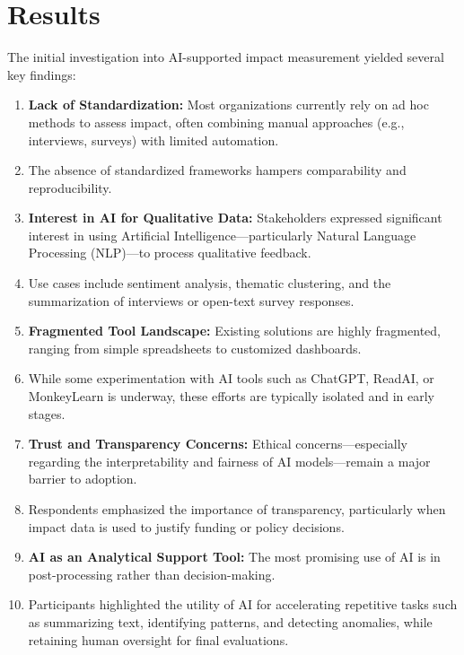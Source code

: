 

\chapter{Results}\label{ch:results}

The initial investigation into AI-supported impact measurement yielded several key findings:

\begin{enumerate}

 \item \textbf{Lack of Standardization:} Most organizations currently rely on ad hoc methods to assess impact, often combining manual approaches (e.g., interviews, surveys) with limited automation.
 \item The absence of standardized frameworks hampers comparability and reproducibility.

 \item \textbf{Interest in AI for Qualitative Data:} Stakeholders expressed significant interest in using Artificial Intelligence—particularly Natural Language Processing (NLP)—to process qualitative feedback.
 \item Use cases include sentiment analysis, thematic clustering, and the summarization of interviews or open-text survey responses.


\item \textbf{Fragmented Tool Landscape:} Existing solutions are highly fragmented, ranging from simple spreadsheets to customized dashboards.
 \item While some experimentation with AI tools such as ChatGPT, ReadAI, or MonkeyLearn is underway, these efforts are typically isolated and in early stages.

\item \textbf{Trust and Transparency Concerns:} Ethical concerns—especially regarding the interpretability and fairness of AI models—remain a major barrier to adoption.
 \item Respondents emphasized the importance of transparency, particularly when impact data is used to justify funding or policy decisions.

\item \textbf{AI as an Analytical Support Tool:} The most promising use of AI is in post-processing rather than decision-making.
 \item Participants highlighted the utility of AI for accelerating repetitive tasks such as summarizing text, identifying patterns, and detecting anomalies, while retaining human oversight for final evaluations.


\end{enumerate}
